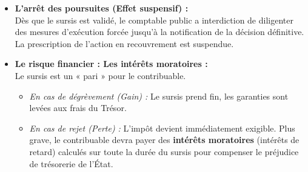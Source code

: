 \documentclass[Cours_contentieuxTF2026.tex]{subfiles}
\begin{document}
\begin{itemize}
	\item \textbf{L'arrêt des poursuites (Effet suspensif) :} \\
	Dès que le sursis est validé, le comptable public a interdiction de diligenter des mesures d'exécution forcée jusqu'à la notification de la décision définitive. La prescription de l'action en recouvrement est suspendue.
	
	\item \textbf{Le risque financier : Les intérêts moratoires :} \\
	Le sursis est un « pari » pour le contribuable.
	\begin{itemize}
		\item \textit{En cas de dégrèvement (Gain) :} Le sursis prend fin, les garanties sont levées aux frais du Trésor.
		\item \textit{En cas de rejet (Perte) :} L'impôt devient immédiatement exigible. Plus grave, le contribuable devra payer des \textbf{intérêts moratoires} (intérêts de retard) calculés sur toute la durée du sursis pour compenser le préjudice de trésorerie de l'État.
	\end{itemize}
\end{itemize}

\vspace{0.5cm}

\begin{center}
\end{center}
\end{document}
